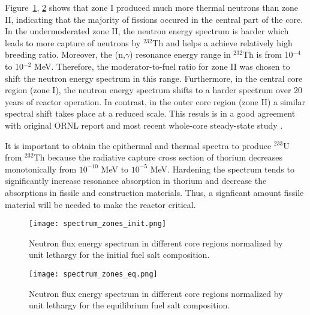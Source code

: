 Figure~\ref{fig:spectrum_zones_init}, \ref{fig:spectrum_zones_eq} shows that zone I produced much more thermal neutrons than zone II, indicating that the majority of fissions occured in the central part of the core. In the undermoderated zone II, the neutron energy spectrum is harder which leads to more capture of neutrons by $^{232}$Th and helps a achieve relatively high breeding ratio. Moreover, the (n,$\gamma$) resonance energy range in $^{232}$Th is from 10$^{-4}$ to 10$^{-2}$ MeV. Therefore, the moderator-to-fuel ratio for zone II was chosen to shift the neutron energy spectrum in this range. Furthermore, in the central core region (zone I), the neutron energy spectrum shifts to a harder spectrum over 20 years of reactor operation. In contrast, in the outer core region (zone II) a similar spectral shift takes place at a reduced scale. This resuls is in a good agreement with original ORNL report \cite{robertson_conceptual_1971} and most recent whole-core steady-state study \cite{park_whole_2015}.

It is important to obtain the epithermal and thermal spectra to produce $^{233}$U from $^{232}$Th because the radiative capture cross section of thorium decreases monotonically from $10^{-10}$ MeV to $10^{-5}$ MeV. Hardening the spectrum tends to significantly increase resonance absorption in thorium and decrease the absorptions in fissile and construction materials. Thus, a signficant amount fissile material will be needed to make the reactor critical. 

\begin{figure}[htp!] %
  \centering
    \vspace{-0.3em}
  \texttt{[image: spectrum\_zones\_init.png]} 
  \caption{Neutron flux energy spectrum in different core regions normalized by unit lethargy for the initial fuel salt composition.}
    \vspace{-1.6em}
  \label{fig:spectrum_zones_init}
\end{figure}
\begin{figure}[htp!] %
  \centering
    \vspace{-0.3em}
  \texttt{[image: spectrum\_zones\_eq.png]} 
  \caption{Neutron flux energy spectrum in different core regions normalized by unit lethargy for the equilibrium fuel salt composition.}
    \vspace{-1.6em}
  \label{fig:spectrum_zones_eq}
\end{figure}
\FloatBarrier

